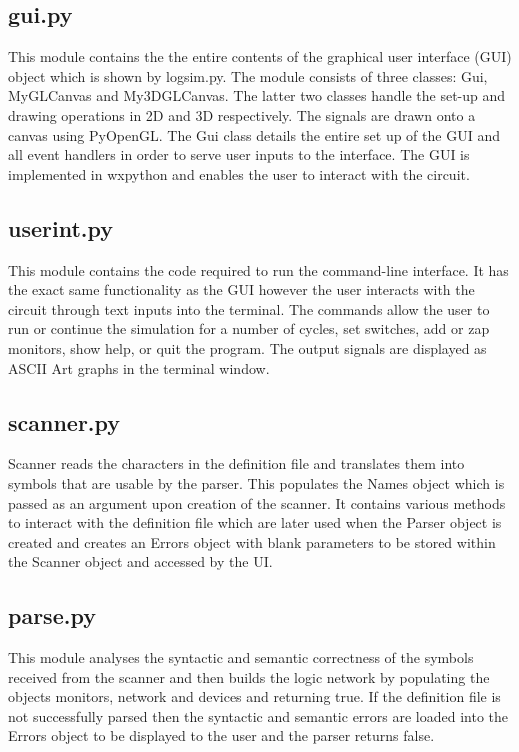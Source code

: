 \documentclass{article}					%
\begin{document}
\subsection{gui.py}
This module contains the the entire contents of the graphical user interface (GUI) object which is shown by logsim.py. The module consists of three classes: Gui, MyGLCanvas and My3DGLCanvas. The latter two classes handle the set-up and drawing operations in 2D and 3D respectively. The signals are drawn onto a canvas using PyOpenGL. The Gui class details the entire set up of the GUI and all event handlers in order to serve user inputs to the interface. The GUI is implemented in wxpython and enables the user to interact with the circuit.

\subsection{userint.py}
This module contains the code required to run the command-line interface. It has the exact same functionality as the GUI however the user interacts with the circuit through text inputs into the terminal. The commands allow the user to run or continue the simulation for a number of cycles, set switches, add or zap monitors, show help, or quit the program. The output signals are displayed as ASCII Art graphs in the terminal window.

\subsection{scanner.py}
Scanner reads the characters in the definition file and translates them into symbols that are usable by the parser. This populates the Names object which is passed as an argument upon creation of the scanner. It contains various methods to interact with the definition file which are later used when the Parser object is created and creates an Errors object with blank parameters to be stored within the Scanner object and accessed by the UI.

\subsection{parse.py}
This module analyses the syntactic and semantic correctness of the symbols received from the scanner and then builds the logic network by populating the objects monitors, network and devices and returning true. If the definition file is not successfully parsed then the syntactic and semantic errors are loaded into the Errors object to be displayed to the user and the parser returns false.
\end{document}
